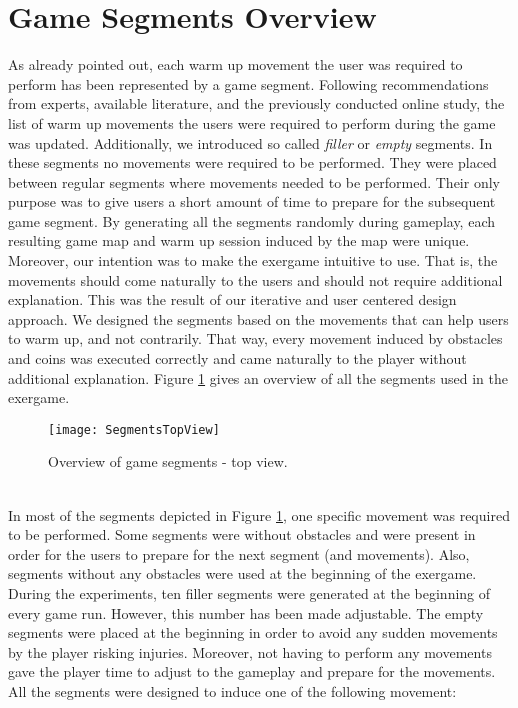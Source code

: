 \section{Game Segments Overview}
As already pointed out, each warm up movement the user was required to perform has been represented by a game segment. Following recommendations from experts, available literature, and the previously conducted online study, the list of warm up movements the users were required to perform during the game was updated. Additionally, we introduced so called \textit{filler} or \textit{empty} segments. In these segments no movements were required to be performed. They were placed between regular segments where movements needed to be performed. Their only purpose was to give users a short amount of time to prepare for the subsequent game segment. By generating all the segments randomly during gameplay, each resulting game map and warm up session induced by the map were unique. Moreover, our intention was to make the exergame intuitive to use. That is, the movements should come naturally to the users and should not require additional explanation. This was the result of our iterative and user centered design approach. We designed the segments based on the movements that can help users to warm up, and not contrarily. That way, every movement induced by obstacles and coins was executed correctly and came naturally to the player without additional explanation. Figure \ref{fig:topview} gives an overview of all the segments used in the exergame.\pagebreak
\begin{figure}[h]
    \centering
    \texttt{[image: SegmentsTopView]}
    \caption{Overview of game segments - top view.}
    \label{fig:topview}
\end{figure}\\
In most of the segments depicted in Figure \ref{fig:topview}, one specific movement was required to be performed. Some segments were without obstacles and were present in order for the users to prepare for the next segment (and movements). Also, segments without any obstacles were used at the beginning of the exergame. During the experiments, ten filler segments were generated at the beginning of every game run. However, this number has been made adjustable. The empty segments were placed at the beginning in order to avoid any sudden movements by the player risking injuries. Moreover, not having to perform any movements gave the player time to adjust to the gameplay and prepare for the movements. All the segments were designed to induce one of the following movement:
